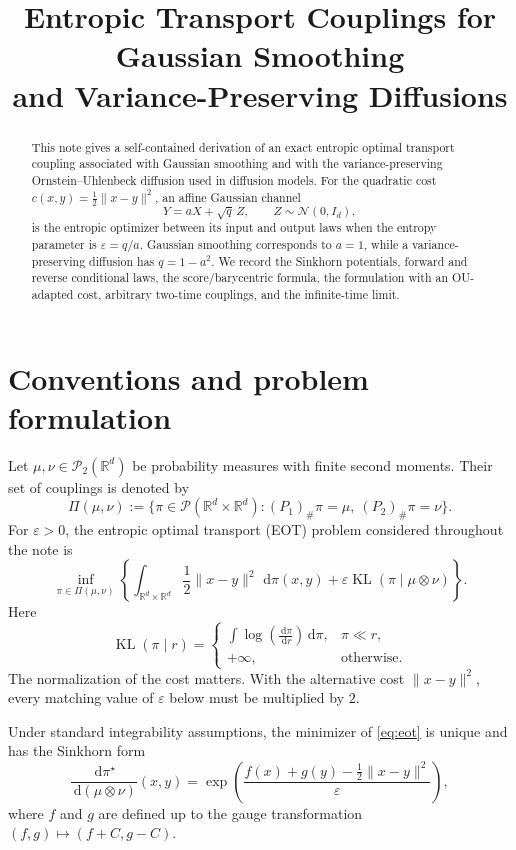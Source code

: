 \documentclass[11pt]{article}
\title{Entropic Transport Couplings for Gaussian Smoothing\\
and Variance-Preserving Diffusions}
\author{}
\date{}
\theoremstyle{remark}
\newcommand{\R}{\mathbb{R}}
\newcommand{\N}{\mathcal{N}}
\newcommand{\KL}{\operatorname{KL}}
\newcommand{\PiC}{\Pi}
\newcommand{\dd}{\,\mathrm{d}}
\newcommand{\push}{_{\#}}
\begin{document}
\maketitle

\begin{abstract}
This note gives a self-contained derivation of an exact entropic optimal
transport coupling associated with Gaussian smoothing and with the
variance-preserving Ornstein--Uhlenbeck diffusion used in diffusion models.
For the quadratic cost $c(x,y)=\frac12\lVert x-y\rVert^2$, an affine Gaussian
channel
\[
  Y=aX+\sqrt q\,Z, \qquad Z\sim\N(0,I_d),
\]
is the entropic optimizer between its input and output laws when the entropy
parameter is $\varepsilon=q/a$.  Gaussian smoothing corresponds to $a=1$,
while a variance-preserving diffusion has $q=1-a^2$.  We record the Sinkhorn
potentials, forward and reverse conditional laws, the score/barycentric
formula, the formulation with an OU-adapted cost, arbitrary two-time
couplings, and the infinite-time limit.
\end{abstract}

\tableofcontents

\section{Conventions and problem formulation}

Let $\mu,\nu\in\mathcal P_2(\R^d)$ be probability measures with finite
second moments.  Their set of couplings is denoted by
\[
  \PiC(\mu,\nu)
  :=\{\pi\in\mathcal P(\R^d\times\R^d):
       (P_1)\push\pi=\mu,\ (P_2)\push\pi=\nu\}.
\]
For $\varepsilon>0$, the entropic optimal transport (EOT) problem considered
throughout the note is
\begin{equation}
  \label{eq:eot}
  \inf_{\pi\in\PiC(\mu,\nu)}
  \left\{
    \int_{\R^d\times\R^d}\frac12\lVert x-y\rVert^2\,\dd\pi(x,y)
    +\varepsilon\KL(\pi\mid\mu\otimes\nu)
  \right\}.
\end{equation}
Here
\[
  \KL(\pi\mid r)
  =\begin{cases}
    \displaystyle\int\log\!\left(\frac{\dd\pi}{\dd r}\right)\dd\pi,
       &\pi\ll r,\\[1ex]
    +\infty,&\text{otherwise}.
  \end{cases}
\]
The normalization of the cost matters.  With the alternative cost
$\lVert x-y\rVert^2$, every matching value of $\varepsilon$ below must be
multiplied by $2$.

Under standard integrability assumptions, the minimizer of
\eqref{eq:eot} is unique and has the Sinkhorn form
\begin{equation}
  \label{eq:sinkhorn-form}
  \frac{\dd\pi^\star}{\dd(\mu\otimes\nu)}(x,y)
  =\exp\!\left(
    \frac{f(x)+g(y)-\frac12\lVert x-y\rVert^2}{\varepsilon}
  \right),
\end{equation}
where $f$ and $g$ are defined up to the gauge transformation
$(f,g)\mapsto(f+C,g-C)$.
\end{document}
